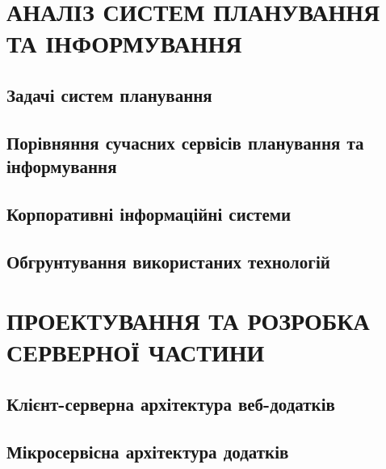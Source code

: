 \documentclass[a4paper,14pt]{extarticle} %
\begin{document}

\tableofcontents %
\clearpage


\section{АНАЛІЗ СИСТЕМ ПЛАНУВАННЯ ТА ІНФОРМУВАННЯ}
\subsection{Задачі систем планування} 

\subsection{Порівняння сучасних сервісів планування та інформування} 




\subsection{Корпоративні інформаційні системи} 



\subsection{Обгрунтування використаних технологій} 







\clearpage
\section{ПРОЕКТУВАННЯ ТА РОЗРОБКА СЕРВЕРНОЇ ЧАСТИНИ}

\subsection{Клієнт-серверна архітектура веб-додатків} 

\subsection{Мікросервісна архітектура додатків} 
\end{document}
